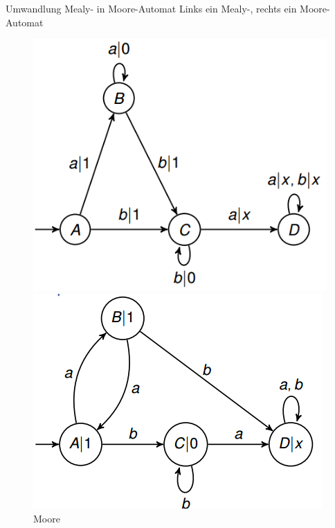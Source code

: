 \documentclass[handout]{beamer}
\begin{document}
\begin{frame}{Umwandlung Mealy- in Moore-Automat}
	Links ein Mealy-, rechts ein Moore-Automat
	
	
	\begin{figure}[!tbp]
		\centering
		\begin{minipage}[b]{0.4\textwidth}
			\includegraphics[width=\textwidth]{images/MealyBsp.png}
			\caption{Mealy}
		\end{minipage}
		\hfill
		\pause
		\begin{minipage}[b]{0.4\textwidth}
			\includegraphics[width=\textwidth]{images/MooreBsp.png}
			\caption{Moore}
		\end{minipage}
	\end{figure}

\end{frame}
\end{document}
